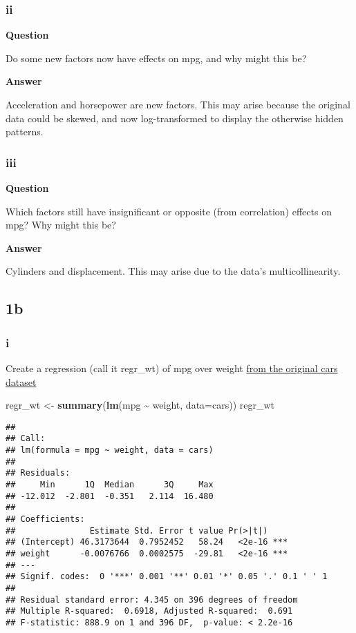 \documentclass[
]{article}
\newenvironment{Shaded}{\begin{snugshade}}{\end{snugshade}}
\newcommand{\AttributeTok}[1]{\textcolor[rgb]{0.13,0.29,0.53}{#1}}
\newcommand{\FunctionTok}[1]{\textcolor[rgb]{0.13,0.29,0.53}{\textbf{#1}}}
\newcommand{\NormalTok}[1]{#1}
\newcommand{\OtherTok}[1]{\textcolor[rgb]{0.56,0.35,0.01}{#1}}
\newcommand{\SpecialCharTok}[1]{\textcolor[rgb]{0.81,0.36,0.00}{\textbf{#1}}}
\begin{document}
\hypertarget{ii}{%
\subsubsection{ii}\label{ii}}

\textbf{Question}

Do some new factors now have effects on mpg, and why might this be?

\textbf{Answer}

Acceleration and horsepower are new factors. This may arise because the
original data could be skewed, and now log-transformed to display the
otherwise hidden patterns.

\hypertarget{iii}{%
\subsubsection{iii}\label{iii}}

\textbf{Question}

Which factors still have insignificant or opposite (from correlation)
effects on mpg? Why might this be?

\textbf{Answer}

Cylinders and displacement. This may arise due to the data's
multicollinearity.

\hypertarget{b}{%
\subsection{1b}\label{b}}

\hypertarget{i-1}{%
\subsubsection{i}\label{i-1}}

Create a regression (call it regr\_wt) of mpg over weight \ul{from the
original cars dataset}

\begin{Shaded}
\begin{Highlighting}[]
\NormalTok{regr\_wt }\OtherTok{\textless{}{-}} \FunctionTok{summary}\NormalTok{(}\FunctionTok{lm}\NormalTok{(mpg }\SpecialCharTok{\textasciitilde{}}\NormalTok{ weight, }\AttributeTok{data=}\NormalTok{cars))}
\NormalTok{regr\_wt}
\end{Highlighting}
\end{Shaded}

\begin{verbatim}
## 
## Call:
## lm(formula = mpg ~ weight, data = cars)
## 
## Residuals:
##     Min      1Q  Median      3Q     Max 
## -12.012  -2.801  -0.351   2.114  16.480 
## 
## Coefficients:
##               Estimate Std. Error t value Pr(>|t|)    
## (Intercept) 46.3173644  0.7952452   58.24   <2e-16 ***
## weight      -0.0076766  0.0002575  -29.81   <2e-16 ***
## ---
## Signif. codes:  0 '***' 0.001 '**' 0.01 '*' 0.05 '.' 0.1 ' ' 1
## 
## Residual standard error: 4.345 on 396 degrees of freedom
## Multiple R-squared:  0.6918, Adjusted R-squared:  0.691 
## F-statistic: 888.9 on 1 and 396 DF,  p-value: < 2.2e-16
\end{verbatim}
\end{document}
